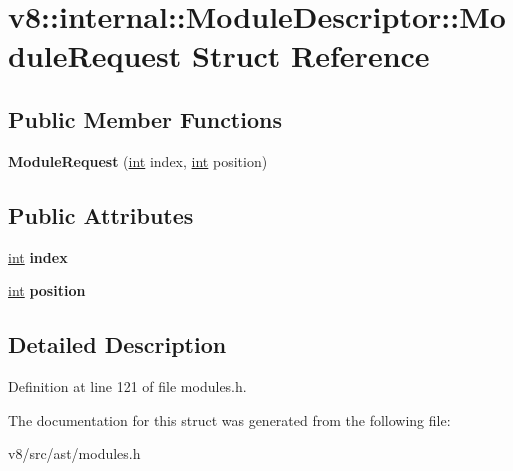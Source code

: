 \hypertarget{structv8_1_1internal_1_1ModuleDescriptor_1_1ModuleRequest}{}\section{v8\+:\+:internal\+:\+:Module\+Descriptor\+:\+:Module\+Request Struct Reference}
\label{structv8_1_1internal_1_1ModuleDescriptor_1_1ModuleRequest}
\subsection*{Public Member Functions}
\begin{DoxyCompactItemize}
\item 
\mbox{\label{structv8_1_1internal_1_1ModuleDescriptor_1_1ModuleRequest_a30f5a85102972ebc0f89d95fdbd3704b}} 
{\bfseries Module\+Request} (\mbox{\hyperlink{classint}{int}} index, \mbox{\hyperlink{classint}{int}} position)
\end{DoxyCompactItemize}
\subsection*{Public Attributes}
\begin{DoxyCompactItemize}
\item 
\mbox{\label{structv8_1_1internal_1_1ModuleDescriptor_1_1ModuleRequest_a47f3fc35926102ca6f7d9f454b9098c2}} 
\mbox{\hyperlink{classint}{int}} {\bfseries index}
\item 
\mbox{\label{structv8_1_1internal_1_1ModuleDescriptor_1_1ModuleRequest_ac9727becbf8ea53916429fa45a50042a}} 
\mbox{\hyperlink{classint}{int}} {\bfseries position}
\end{DoxyCompactItemize}


\subsection{Detailed Description}


Definition at line 121 of file modules.\+h.



The documentation for this struct was generated from the following file\+:\begin{DoxyCompactItemize}
\item 
v8/src/ast/modules.\+h\end{DoxyCompactItemize}
